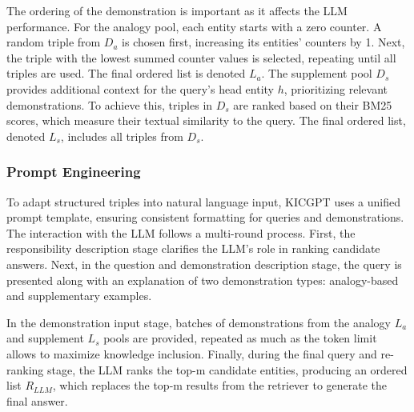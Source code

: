The ordering of the demonstration is important as it affects the LLM performance.
For the analogy pool, each entity starts with a zero counter. 
A random triple from \(D_a\) is chosen first, increasing its entities'
counters by 1. Next, the triple with the lowest summed counter values 
is selected, repeating until all triples are used. The final ordered 
list is denoted \(L_a\). The supplement pool \(D_s\) provides additional context 
for the query's head entity \(h\), prioritizing relevant demonstrations. 
To achieve this, triples in \(D_s\) are ranked based on their BM25 scores, 
which measure their textual similarity to the query. The final ordered list, 
denoted \(L_s\), includes all triples from \(D_s\).

\subsubsection{Prompt Engineering}

To adapt structured triples into natural language input, KICGPT uses 
a unified prompt template, ensuring consistent formatting for queries 
and demonstrations. The interaction with the LLM follows a multi-round 
process. First, the responsibility description stage clarifies the LLM's 
role in ranking candidate answers. Next, in the question and demonstration 
description stage, the query is presented along with an explanation of 
two demonstration types: analogy-based and supplementary examples.

In the demonstration input stage, batches of demonstrations from the 
analogy \(L_a\) and supplement \(L_s\) pools are provided, repeated 
as much as the token limit allows to maximize knowledge inclusion. 
Finally, during the final query and re-ranking stage, the LLM ranks 
the top-m candidate entities, producing an ordered list \(R_{LLM}\), 
which replaces the top-m results from the retriever to generate the 
final answer.